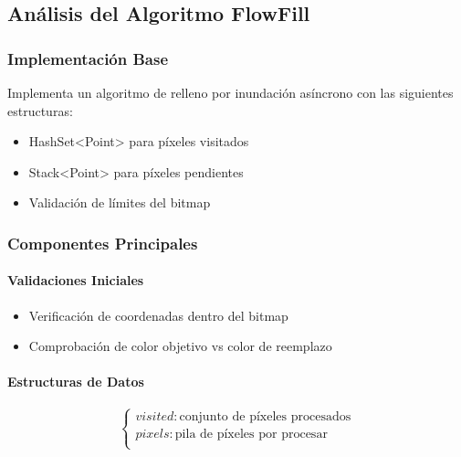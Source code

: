 \documentclass[12pt]{article}
\begin{document}
\subsection{Análisis del Algoritmo FlowFill}

\subsubsection{Implementación Base}
Implementa un algoritmo de relleno por inundación asíncrono con las siguientes estructuras:
\begin{itemize}
    \item HashSet<Point> para píxeles visitados
    \item Stack<Point> para píxeles pendientes
    \item Validación de límites del bitmap
\end{itemize}

\subsubsection{Componentes Principales}
\paragraph{Validaciones Iniciales}
\begin{itemize}
    \item Verificación de coordenadas dentro del bitmap
    \item Comprobación de color objetivo vs color de reemplazo
\end{itemize}

\paragraph{Estructuras de Datos}
\begin{equation}
    \begin{cases}
        visited: \text{conjunto de píxeles procesados} \\
        pixels: \text{pila de píxeles por procesar} \\
    \end{cases}
\end{equation}
\end{document}
